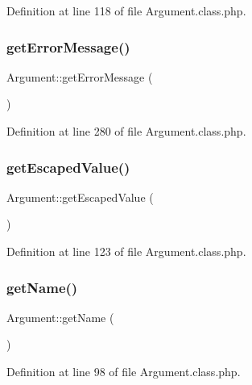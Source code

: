 Definition at line 118 of file Argument.\+class.\+php.

\hypertarget{classArgument_a6e75159f2fad478ff488bf9cff5ba139}{}\label{classArgument_a6e75159f2fad478ff488bf9cff5ba139} 
\subsubsection{\texorpdfstring{get\+Error\+Message()}{getErrorMessage()}}
{\footnotesize\ttfamily Argument\+::get\+Error\+Message (\begin{DoxyParamCaption}{ }\end{DoxyParamCaption})}



Definition at line 280 of file Argument.\+class.\+php.

\hypertarget{classArgument_a02ee73fa63dd2cd754412f176dae54da}{}\label{classArgument_a02ee73fa63dd2cd754412f176dae54da} 
\subsubsection{\texorpdfstring{get\+Escaped\+Value()}{getEscapedValue()}}
{\footnotesize\ttfamily Argument\+::get\+Escaped\+Value (\begin{DoxyParamCaption}{ }\end{DoxyParamCaption})}



Definition at line 123 of file Argument.\+class.\+php.

\hypertarget{classArgument_a592176260424f46cf1b83bf2eb14014e}{}\label{classArgument_a592176260424f46cf1b83bf2eb14014e} 
\subsubsection{\texorpdfstring{get\+Name()}{getName()}}
{\footnotesize\ttfamily Argument\+::get\+Name (\begin{DoxyParamCaption}{ }\end{DoxyParamCaption})}



Definition at line 98 of file Argument.\+class.\+php.

